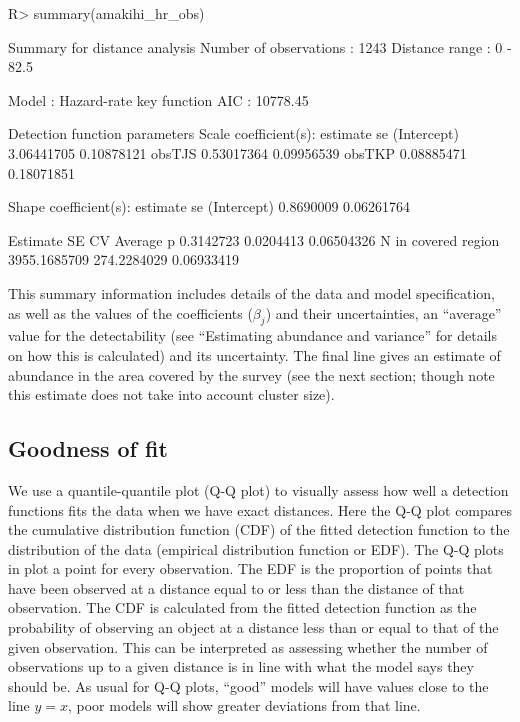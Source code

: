 \documentclass[article,shortnames]{jss}
\begin{document}
\begin{CodeChunk}
\begin{CodeInput}
R> summary(amakihi_hr_obs)
\end{CodeInput}
\begin{CodeOutput}

Summary for distance analysis 
Number of observations :  1243 
Distance range         :  0  -  82.5 

Model : Hazard-rate key function 
AIC   : 10778.45 

Detection function parameters
Scale coefficient(s):  
              estimate         se
(Intercept) 3.06441705 0.10878121
obsTJS      0.53017364 0.09956539
obsTKP      0.08885471 0.18071851

Shape coefficient(s):  
             estimate         se
(Intercept) 0.8690009 0.06261764

                        Estimate          SE         CV
Average p              0.3142723   0.0204413 0.06504326
N in covered region 3955.1685709 274.2284029 0.06933419
\end{CodeOutput}
\end{CodeChunk}

This summary information includes details of the data and model
specification, as well as the values of the coefficients (\(\beta_j\))
and their uncertainties, an ``average'' value for the detectability (see
``Estimating abundance and variance'' for details on how this is
calculated) and its uncertainty. The final line gives an estimate of
abundance in the area covered by the survey (see the next section;
though note this estimate does not take into account cluster size).

\subsection{Goodness of fit}\label{goodness-of-fit}

We use a quantile-quantile plot (Q-Q plot) to visually assess how well a
detection functions fits the data when we have exact distances. Here the
Q-Q plot compares the cumulative distribution function (CDF) of the
fitted detection function to the distribution of the data (empirical
distribution function or EDF). The Q-Q plots in  plot a
point for every observation. The EDF is the proportion of points that
have been observed at a distance equal to or less than the distance of
that observation. The CDF is calculated from the fitted detection
function as the probability of observing an object at a distance less
than or equal to that of the given observation. This can be interpreted
as assessing whether the number of observations up to a given distance
is in line with what the model says they should be. As usual for Q-Q
plots, ``good'' models will have values close to the line \(y=x\), poor
models will show greater deviations from that line.
\end{document}
